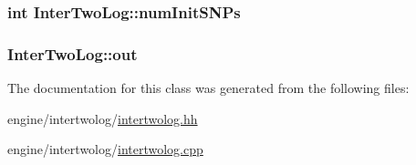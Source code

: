 \label{classInterTwoLog_aa36dd9a588d9b0ad8a322ac3672f22f0}
\hypertarget{classInterTwoLog_abc10f45a18be673c9da60e34e34407a1}{
\subsubsection[{numInitSNPs}]{\setlength{\rightskip}{0pt plus 5cm}int {\bf InterTwoLog::numInitSNPs}}}
\label{classInterTwoLog_abc10f45a18be673c9da60e34e34407a1}
\hypertarget{classInterTwoLog_a25742365edccdd4b3be23f85a39d942a}{
\subsubsection[{out}]{ {\bf InterTwoLog::out}}}
\label{classInterTwoLog_a25742365edccdd4b3be23f85a39d942a}


The documentation for this class was generated from the following files:\begin{DoxyCompactItemize}
\item 
engine/intertwolog/\hyperlink{intertwolog_8hh}{intertwolog.hh}\item 
engine/intertwolog/\hyperlink{intertwolog_8cpp}{intertwolog.cpp}\end{DoxyCompactItemize}
